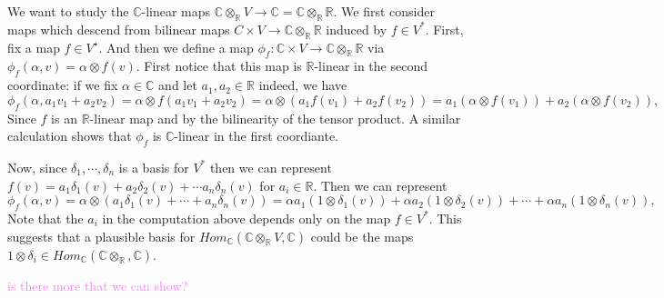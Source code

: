 \documentclass[12pt,letterpaper,boxed]{hmcpset}
\newcommand{\wg}[1]{\textcolor{violet}{#1}}
\newcommand{\R}{\mathbb R}
\newcommand{\C}{\mathbb C}
\begin{document}
\begin{solution}
\item We want to study the $\C$-linear maps 
$\C \otimes_\R V \to \C = \C \otimes_\R \R$. We first consider maps
which descend from bilinear maps $C \times V \to  \C \otimes_\R \R$
induced by $f \in V^*$.
First, fix a map $f \in
V^\star$. And then we define a map $\phi_f: \C \times V \to  \C
\otimes_\R \R$ via $\phi_f(\alpha, v) = \alpha \otimes f(v)$.
First notice that this map is $\R$-linear in the second coordinate: if
we fix $\alpha \in \C$ and let $a_1, a_2 \in \R$ indeed, we have \[
\phi_f(\alpha, a_1v_1 + a_2 v_2) = \alpha \otimes f(a_1 v_1 + a_2 v_2)
	= \alpha \otimes (a_1 f(v_1) + a_2 f(v_2)) 
	= a_1(\alpha \otimes f(v_1)) + a_2(\alpha \otimes f(v_2)), 
\]
Since $f$ is an $\R$-linear map and by the bilinearity of the tensor
product.
A similar calculation shows that $\phi_f$ is $\C$-linear in the first
coordiante.

Now, since $\delta_1, \cdots, \delta_n$ is a basis for $V^*$ then we
can represent $f(v) = a_1 \delta_1(v) + a_2 \delta_2(v) + \cdots a_n
\delta_n(v)$ for $a_i \in \R$. Then we can represent
\[
\phi_f(\alpha, v) = \alpha \otimes (a_1\delta_1(v) + \cdots + a_n \delta_n(v))
	= \alpha a_1 (1 \otimes \delta_1(v)) + \alpha a_2 (1 \otimes \delta_2(v)) +
		\cdots + \alpha a_n (1 \otimes \delta_n(v)),
\]
Note that the $a_i$ in the computation above depends only on the map
$f \in V^*$. 
This suggests that a plausible basis for $Hom_\C(\C \otimes_\R V, \C)$
could be the maps $1 \otimes \delta_i \in Hom_\C(\C \otimes_\R, \C).$

\wg{is there more that we can show?}




\end{solution}

\newpage


\begin{problem}[4]
	\hfill
\end{problem}

\begin{solution}
\end{solution}

\newpage
\end{document}
